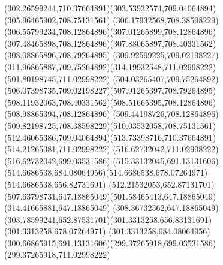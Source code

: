 {{	\curveto(302.26599244,710.37664891)(303.53932574,709.04064894)(305.96465902,708.75131561)
	\curveto(306.17932568,708.38598229)(306.55799234,708.12864896)(307.01265899,708.12864896)
	\curveto(307.48465898,708.12864896)(307.88065897,708.40331562)(308.08865896,708.79264895)
	\curveto(309.92599225,709.02198227)(311.96865887,709.75264892)(314.19932548,711.02998222)
	\lineto(501.80198745,711.02998222)
	\curveto(504.03265407,709.75264892)(506.07398735,709.02198227)(507.91265397,708.79264895)
	\curveto(508.11932063,708.40331562)(508.51665395,708.12864896)(508.98865394,708.12864896)
	\curveto(509.44198726,708.12864896)(509.82198725,708.38598229)(510.03532058,708.75131561)
	\curveto(512.46065386,709.04064894)(513.73398716,710.37664891)(514.21265381,711.02998222)
	\lineto(516.62732042,711.02998222)
	\lineto(516.62732042,699.03531586)
	\curveto(515.33132045,691.13131606)(514.6686538,684.08064956)(514.6686538,678.07264971)
	\lineto(514.6686538,656.82731691)
	\curveto(512.21532053,652.87131701)(507.63798731,647.18865049)(501.58465413,647.18865049)
	\lineto(314.41665881,647.18865049)
	\curveto(308.36732562,647.18865049)(303.78599241,652.87531701)(301.3313258,656.83131691)
	\lineto(301.3313258,678.07264971)
	\curveto(301.3313258,684.08064956)(300.66865915,691.13131606)(299.37265918,699.03531586)
	\lineto(299.37265918,711.02998222)
	\closepath
}
}
{
}
